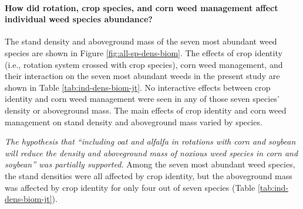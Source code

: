\documentclass[
]{article}
\begin{document}
\hypertarget{how-did-rotation-crop-species-and-corn-weed-management-affect-individual-weed-species-abundance}{%
\paragraph*{How did rotation, crop species, and corn weed management affect individual weed species abundance?}\label{how-did-rotation-crop-species-and-corn-weed-management-affect-individual-weed-species-abundance}}

The stand density and aboveground mass of the seven most abundant weed species are shown in Figure \ref{fig:all-sp-dens-biom}. The effects of crop identity (i.e., rotation system crossed with crop species), corn weed management, and their interaction on the seven most abundant weeds in the present study are shown in Table \ref{tab:ind-dens-biom-jt}.
No interactive effects between crop identity and corn weed management were seen in any of those seven species' density or aboveground mass. The main effects of crop identity and corn weed management on stand density and aboveground mass varied by species.

\emph{The hypothesis that ``including oat and alfalfa in rotations with corn and soybean will reduce the density and aboveground mass of noxious weed species in corn and soybean'' was partially supported.} Among the seven most abundant weed species, the stand densities were all affected by crop identity, but the aboveground mass was affected by crop identity for only four out of seven species (Table \ref{tab:ind-dens-biom-jt}).
\end{document}
